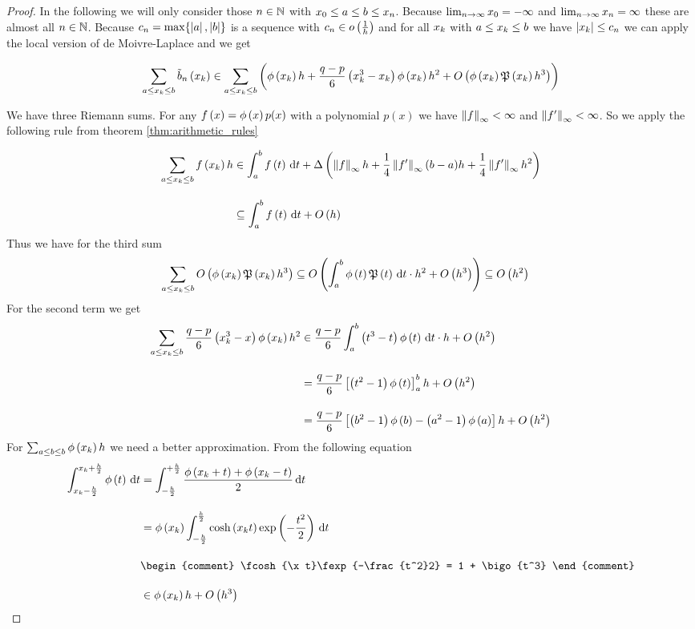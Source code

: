 \begin{proof}
  In the following we will only consider those $n\in\N$ with $\x[0] \le a \le b \le \x[n]$. Because $\lim_{n\to\infty} \x[0] = -\infty$ and $\lim_{n\to\infty} \x[n] = \infty$ these are almost all $n\in\N$. Because $c_n=\max\{\abs{a},\abs{b}\}$ is a sequence with $c_n\in\littleo{\frac 1h}$ and for all $\x$ with $a \le \x \le b$ we have $\abs{\x} \le c_n$ we can apply the local version of de Moivre-Laplace and we get

  \begin{align}
    \sum_{a \le \x \le b} \bb{\x} \in \sum_{a \le \x \le b} \br{\fphi{\x} h +\frac{q-p}6 \left(\x^3 - \x\right) \fphi{\x} h^2 + \bigo{\fphi{\x}\pol{\x}h^3}}
  \end{align}

  We have three Riemann sums. For any $\f{x}=\fphi{x}p(x)$ with a polynomial $p(x)$ we have $\snorm{f} < \infty$ and $\snorm{f'}<\infty$. So we apply the following rule from theorem \ref{thm:arithmetic_rules}

  \begin{align}
    \sum_{a \le \x \le b} \f{\x} h & \in \int_a^b \f{t} \d{t} + \bigabs{\snorm{f}h + \frac 14 \snorm{f'} (b-a) h + \frac 14 \snorm{f'} h^2} \bnl
    & \subseteq  \int_a^b \f{t} \d{t} + \bigo{h}
  \end{align}
  Thus we have for the third sum
  \begin{align}
    \sum_{a \le \x \le b} \bigo{\fphi{\x} \pol{\x} h^3} & \subseteq \bigo{\int_a^b \fphi{t} \pol{t} \d{t} \cdot h^2 + \bigo{h^3}} \subseteq \bigo{h^2}
  \end{align}
  For the second term we get
  \begin{align}
    \sum_{a \le \x \le b} \frac{q-p}6 \br{\x^3 - x} \fphi{\x} h^2 &\in \frac{q-p}6 \int_a^b \br{t^3-t}\fphi{t} \d{t} \cdot h + \bigo{h^2} \bnl
    &= \frac{q-p}6 \left[ \br{t^2-1}\fphi{t} \right]_a^b h + \bigo{h^2} \bnl
    &= \frac{q-p}6 \left[ \br{b^2-1}\fphi{b} - \br{a^2-1}\fphi{a} \right] h + \bigo{h^2}
  \end{align}
  For $\sum_{a\le b\le b} \fphi{\x}h$ we need a better approximation. From the following equation
  \begin{align}
    \int_{\x-\frac h2}^{\x+\frac h2} \fphi{t} \d{t} & = \int_{-\frac h2}^{+\frac h2} \frac{\fphi{\x+t}+\fphi{\x-t}}2 \d{t} \bnl
    & = \fphi{\x} \int_{-\frac h2}^{\frac h2} \fcosh{\x t} \fexp{-\frac{t^2}2} \d{t} \bnl
    &
    \begin{comment}
      \fcosh{\x t}\fexp{-\frac{t^2}2} = 1 + \bigo{t^3}
    \end{comment} \bnl
    & \in \fphi{\x} h + \bigo{h^3}
  \end{align}


\end{proof}
